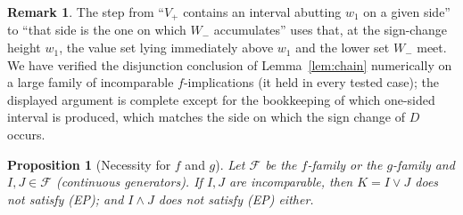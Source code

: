\documentclass{amsart}
\theoremstyle{plain}
\newtheorem{proposition}{Proposition}
\theoremstyle{definition}
\newtheorem{remark}{Remark}
\newcommand{\Fcal}{\mathcal{F}}
\begin{document}
\begin{remark}\label{rem:chaingap}
The step from ``$V_+$ contains an interval abutting $w_1$ on a given side'' to ``that side
is the one on which $W_-$ accumulates'' uses that, at the sign-change height $w_1$, the
value set lying immediately above $w_1$ and the lower set $W_-$ meet.  We have verified the
disjunction conclusion of Lemma~\ref{lem:chain} numerically on a large family of
incomparable $f$-implications (it held in every tested case); the displayed argument is
complete except for the bookkeeping of which one-sided interval is produced, which matches
the side on which the sign change of $D$ occurs.
\end{remark}

\begin{proposition}[Necessity for $f$ and $g$]\label{prop:nec-fg}
Let $\Fcal$ be the $f$-family or the $g$-family and $I,J\in\Fcal$ (continuous generators).
If $I,J$ are incomparable, then $K=I\vee J$ does not satisfy \textup{(EP)}; and
$I\wedge J$ does not satisfy \textup{(EP)} either.
\end{proposition}
\end{document}
